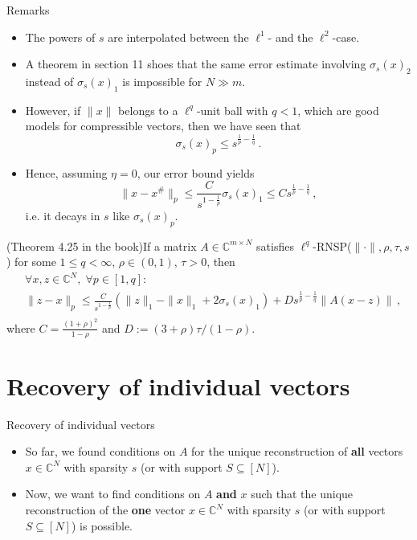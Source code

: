 \documentclass[11pt]{beamer}
\newcommand{\CC}{\mathbb{C}}
\renewcommand{\emph}{\textbf}
\begin{document}
 \begin{frame}{Remarks}
	\begin{itemize}
		\item The powers of \(s\) are interpolated between the \(\ell^1\)- and the \(\ell^2\)-case.
		\item A theorem in section 11 shoes that the same error estimate involving \(\sigma_s(x)_2\) instead of \(\sigma_s(x)_1\) is impossible for \(N\gg m\).
		\item However, if \(\|x\|\) belongs to a \(\ell^q\)-unit ball with \(q<1\), which are good models for compressible vectors, then we have seen that 
		\[\sigma_s(x)_p\le s^{\frac{1}{p}-\frac{1}{q}}\,.\]
		\item Hence, assuming \(\eta=0\), our error bound yields
		\[\|x-x^{\#}\|_p\le \frac{C}{s^{1-\frac{1}{p}}}\sigma_s(x)_1\le Cs^{\frac{1}{p}-\frac{1}{q}}\,,\]
		i.e. it decays in \(s \) like \(\sigma_s(x)_p\).
	\end{itemize}
 \end{frame}

 \begin{frame}
	\begin{Satzz}
		{(Theorem 4.25 in the book)}{}If a matrix \(A\in \CC^{m\times N}\) satisfies \(\ell^q\)-RNSP($\|\cdot\|,\rho,\tau,s$) for some \(1\le q<\infty\), \(\rho\in (0,1)\), \(\tau>0\), then
		\begin{align*}
			&\forall x,z\in \CC^N,\;\forall p\in [1,q]:\\
			&\|z-x\|_p\le \frac{C}{s^{1-\frac{1}{p}}}(\|z\|_1-\|x\|_1+2\sigma_s(x)_1)+Ds^{\frac{1}{p}-\frac{1}{q}}\|A(x-z)\|\,,\\
		\end{align*}
		where \(C=\frac{(1+\rho)^2}{1-\rho}\) and \(D:=(3+\rho)\tau/(1-\rho)\).
	\end{Satzz}
 \end{frame}

\section{Recovery of individual vectors}
\begin{frame}{Recovery of individual vectors}
	\begin{itemize}
		\item So far, we found conditions on \(A \) for the unique reconstruction of \emph{all} vectors \(x\in \CC^N\) with sparsity \(s\) (or with support \(S\subseteq[N]\)).
		\item Now, we want to find conditions on \(A\) \emph{and} \(x\) such that the unique reconstruction of the \emph{one} vector \(x\in \CC^N\) with sparsity \(s\) (or with support \(S\subseteq[N]\)) is possible.
	\end{itemize}
\end{frame}
\end{document}
